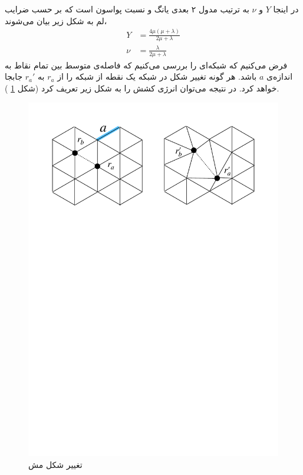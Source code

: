 در اینجا $Y$
و $\nu$
به ترتیب مدول ۲ بعدی یانگ
 و نسبت پواسون
است که بر حسب ضرایب لم به شکل زیر بیان می‌شوند،
\begin{equation}
\begin{aligned}
Y&=\frac{4\mu(\mu+\lambda)}{2\mu+\lambda}\\
\nu&=\frac{\lambda}{2\mu+\lambda}
\label{eq:younglame}
\end{aligned}
\end{equation}
فرض می‌کنیم که شبکه‌ای را بررسی می‌کنیم که فاصله‌ی متوسط بین تمام نقاط به اندازه‌ی $a$ باشد. هر گونه تغییر شکل در شبکه یک نقطه از شبکه را از $r_a$ به $r_a'$ جابجا خواهد کرد. در نتیجه می‌توان انرژی کشش را به شکل زیر تعریف کرد (شکل
\ref{fig:mesh_def}
).
\begin{figure}[h]
\begin{center}
\includegraphics[width=6in]{Figs/mesh_def.pages.pdf}
\caption{
تغییر شکل مش
}
\label{fig:mesh_def}
\end{center}
\end{figure}

